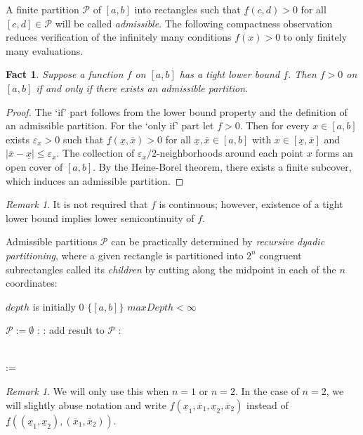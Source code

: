 \documentclass[12pt]{amsart}
\theoremstyle{plain}
\newtheorem{fact}[thm]{Fact}
\theoremstyle{definition}
\theoremstyle{remark}
\newtheorem{rem}[thm]{Remark}
\numberwithin{equation}{section}
\begin{document}
A finite partition $\mathcal{P}$ of $[a,b]$ into rectangles such that $\underline{f}(c,d)>0$ for all $[c,d]\in\mathcal{P}$ will be called \emph{admissible}.
The following compactness observation reduces verification of the infinitely many conditions $f(x)>0$ to only finitely many evaluations.
\begin{fact}\label{fact:admissiblepartition}
Suppose a function $f$ on $[a,b]$ has a tight lower bound $\underline{f}$. Then $f>0$ on $[a,b]$ if and only if there exists an admissible partition.
\end{fact}

\begin{proof}
The `if' part follows from the lower bound property and the definition of an admissible partition.
For the `only if' part let $f>0$. Then for every $x\in [a,b]$ exists $\varepsilon_x>0$ such that $\underline{f}(\underline{x},\overline{x})>0$ for all $\underline{x}, \overline{x}\in [a,b]$ with $x\in [\underline{x},\overline{x}]$ and $|\overline{x}-\underline{x}|\le \varepsilon_x$. The collection of $\varepsilon_x/2$-neighborhoods around each point $x$ forms an open cover of $[a,b]$. By the Heine-Borel theorem, there exists a finite subcover, which induces an admissible partition.
\end{proof}
\begin{rem}
It is not required that $f$ is continuous; however, existence of a tight lower bound implies lower semicontinuity of $f$.
\end{rem}

Admissible partitions $\mathcal{P}$ can be practically determined by {\em recursive dyadic partitioning}, where a given rectangle is partitioned into $2^n$ congruent subrectangles called its {\em children} by cutting along the midpoint in each of the $n$ coordinates:

\begin{algorithmic}
\Comment $depth$ is initially $0$
 \Return $\{[a,b]\}$
 \Fail\Comment $maxDepth<\infty$

\Else
\State $\mathcal{P}:=\emptyset$
:
    : add result to $\mathcal{P}$
    \Else: \Fail
    \EndIf
\EndFor

    \State {}
\EndIf
\EndProcedure\\

\State {} := \\
\end{algorithmic}
\begin{rem}
We will only use this when $n = 1$ or $n = 2$. In the case of $n = 2$, we will slightly abuse notation and write
$\underline{f}(\underline{x}_1,\overline{x}_1,\underline{x}_2,\overline{x}_2)$ instead of $\underline{f}((\underline{x}_1,\underline{x}_2),(\overline{x}_1,\overline{x}_2))$.
\end{rem}
\end{document}

